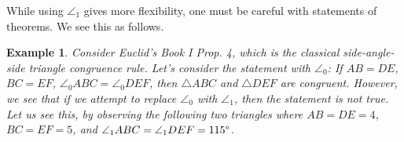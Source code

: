 \documentclass[reqno]{amsart}
\DeclareMathOperator{\1}{\textbf{1}}
\newtheorem{example}[thm]{Example}
\begin{document}
While using $\angle_1$ gives more flexibility, one must be careful with
statements of theorems. We see this as follows.
\begin{example}
    Consider Euclid's Book I Prop. 4, which is the classical side-angle-side
    triangle congruence rule. Let's consider the statement with $\angle_0$:  If
    $AB = DE$, $BC = EF$, $\angle_0 ABC = \angle_0DEF$, then $\triangle ABC$ and
    $\triangle DEF$ are congruent. However, we see that if we attempt to replace
    $\angle_0$ with $\angle_1$, then the statement is not true. Let us see this,
    by observing the following two triangles where $AB = DE = 4$, $BC = EF =5$,
    and $\angle_1ABC = \angle_1DEF = 115\degree$.

    \begin{center}
\end{center}
\end{example}
\end{document}
